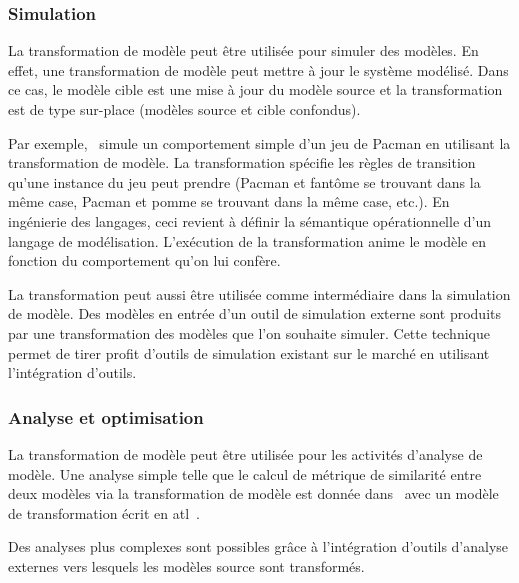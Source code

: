 
\subsubsection{Simulation}

La transformation de modèle peut être utilisée pour simuler des modèles. En 
effet, une transformation de modèle peut mettre à jour le système modélisé. Dans 
ce cas, le modèle cible est une mise à jour du modèle source et la 
transformation est de type sur-place (modèles source et cible confondus). 

Par exemple,~\cite{syriani2011multi} simule un comportement simple d'un jeu de 
Pacman en utilisant la transformation de modèle. La transformation spécifie les 
règles de transition qu'une instance du jeu peut prendre (Pacman et fantôme se 
trouvant dans la même case, Pacman et pomme se trouvant dans la même case, 
etc.). En ingénierie des langages, ceci revient à définir la sémantique 
opérationnelle d'un langage de modélisation. L'exécution de la transformation 
anime le modèle en fonction du comportement qu'on lui confère.

La transformation peut aussi être utilisée comme intermédiaire dans la 
simulation de modèle. Des modèles en entrée d'un outil de simulation externe 
sont produits par une transformation des modèles que l'on souhaite simuler. Cette 
technique permet de tirer profit d'outils de simulation existant sur le marché 
en utilisant l'intégration d'outils.

\subsubsection{Analyse et optimisation}

La transformation de modèle peut être utilisée pour les activités d'analyse de 
modèle. Une analyse simple telle que le calcul de métrique de similarité entre 
deux modèles via la transformation de modèle est donnée dans~\cite{del2007semi} 
avec un modèle de transformation écrit en \gls{atl}~\cite{jouault2006transforming}. 

Des analyses plus complexes sont possibles grâce à l'intégration d'outils 
d'analyse externes vers lesquels les modèles source sont transformés.

